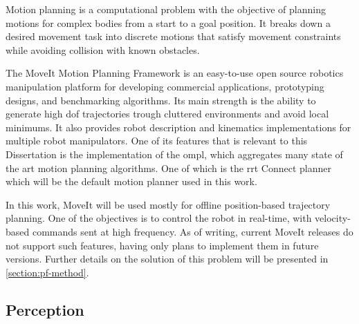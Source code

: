 
\par Motion planning is a computational problem with the objective of planning motions for complex bodies from a start to a goal position. It breaks down a desired movement task into discrete motions that satisfy movement constraints while avoiding collision with known obstacles.
\par The MoveIt Motion Planning Framework \cite{moveit.paper, moveit.online} is an easy-to-use open source robotics manipulation platform for developing commercial applications, prototyping designs, and benchmarking algorithms. Its main strength is the ability to generate high \ac{dof} trajectories trough cluttered environments and avoid local minimums. It also provides robot description and kinematics implementations for multiple robot manipulators. One of its features that is relevant to this Dissertation is the implementation of the \ac{ompl}, which aggregates many state of the art motion planning algorithms. One of which is the \ac{rrt} Connect planner which will be the default motion planner used in this work.
\par In this work, MoveIt will be used mostly for offline position-based trajectory planning. One of the objectives is to control the robot in real-time, with velocity-based commands sent at high frequency. As of writing, current MoveIt releases do not support such features, having only plans to implement them in future versions. Further details on the solution of this problem will be presented in \autoref{section:pf-method}.




\subsection{Perception}

